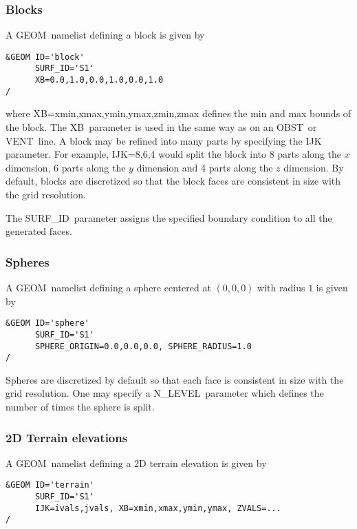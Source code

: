 \documentclass[12pt]{article}
\begin{document}
\subsubsection{Blocks}
A {\ct GEOM}\ namelist defining a block is given by

\begin{verbatim}
&GEOM ID='block'
      SURF_ID='S1'
      XB=0.0,1.0,0.0,1.0,0.0,1.0
/
\end{verbatim}

\noindent where {\ct XB=xmin,xmax,ymin,ymax,zmin,zmax} defines the min and max bounds of the block.
The {\ct XB}\ parameter is used in the same way as on an {\ct OBST}\ or {\ct VENT}\ line.
A block may be refined into many parts by specifying the {\ct IJK} parameter.
For example, {\ct IJK=8,6,4} would split the block into 8 parts along the $x$ dimension,
6 parts along the $y$ dimension and 4 parts along the $z$ dimension.
By default, blocks are discretized so that the block faces are consistent in size with the grid resolution.

The {\ct SURF\_ID}\ parameter assigns the specified boundary condition to all the generated faces.

\subsubsection{Spheres}
A {\ct GEOM}\ namelist defining a sphere centered at $(0,0,0)$ with radius $1$ is given by

\begin{verbatim}
&GEOM ID='sphere'
      SURF_ID='S1'
      SPHERE_ORIGIN=0.0,0.0,0.0, SPHERE_RADIUS=1.0
/
\end{verbatim}

\noindent Spheres are discretized by default so that each face is consistent in size with the grid resolution.
One may specify a {\ct N\_LEVEL}\ parameter which defines the number of times the sphere is split.

\subsubsection{2D Terrain elevations}
A {\ct GEOM}\ namelist defining a 2D terrain elevation is given by

\begin{verbatim}
&GEOM ID='terrain'
      SURF_ID='S1'
      IJK=ivals,jvals, XB=xmin,xmax,ymin,ymax, ZVALS=...
/
\end{verbatim}
\end{document}
